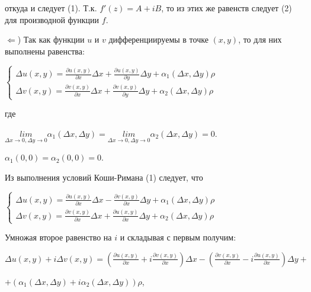 \documentclass[a4paper, 12pt]{report}
\begin{document}
откуда и следует (1). Т.к. $f'(z) = A + iB$, то из этих же равенств следует (2) для производной функции $f$.
\par
$\Leftarrow$) Так как функции $u$ и $v$ дифференциируемы в точке $(x, y)$, то для них выполнены равенства:
\par\bigskip
\begin{center}
   $\begin{cases}
    \Delta u(x, y) = \frac{\partial u(x, y)}{\partial x}\Delta x + \frac{\partial u(x, y)}{\partial y}\Delta y + \alpha_1 (\Delta x, \Delta y)\rho \\
    \Delta v(x, y) = \frac{\partial v(x, y)}{\partial x}\Delta x + \frac{\partial v(x, y)}{\partial y}\Delta y + \alpha_2 (\Delta x, \Delta y)\rho
    \end{cases}$
\end{center}
\par\bigskip
где 
\par\bigskip
\begin{center}
  $\underset{\Delta x \to 0, \Delta y \to 0}{lim} \alpha_1 (\Delta x, \Delta y) = \underset{\Delta x \to 0, \Delta y \to 0}{lim} \alpha_2 (\Delta x, \Delta y) = 0$.
   \par\bigskip
   $\alpha_1(0, 0) = \alpha_2(0,0) = 0$.
\end{center}
\par\bigskip
Из выполнения условий Коши-Римана (1) следует, что 
\par\bigskip
\begin{center}
   $\begin{cases}
    \Delta u(x, y) = \frac{\partial u(x, y)}{\partial x}\Delta x - \frac{\partial v(x, y)}{\partial x}\Delta y + \alpha_1 (\Delta x, \Delta y)\rho \\
    \Delta v(x, y) = \frac{\partial v(x, y)}{\partial x}\Delta x + \frac{\partial u(x, y)}{\partial x}\Delta y + \alpha_2 (\Delta x, \Delta y)\rho
    \end{cases}$
\end{center}
\par\bigskip
Умножая второе равенство на $i$ и складывая с первым получим:
\par\bigskip
\begin{center}
   $\Delta u(x, y) + i\Delta v(x, y) = \left (\frac{\partial u(x, y)}{\partial x} + i\frac{\partial v(x, y)}{\partial x} \right )\Delta x - \left (\frac{\partial v(x, y)}{\partial x} - i\frac{\partial u(x, y)}{\partial x} \right )\Delta y +$
   \par\bigskip
   $ + (\alpha_1 (\Delta x, \Delta y) + i \alpha_2 (\Delta x, \Delta y))\rho$,
\end{center}
\end{document}
